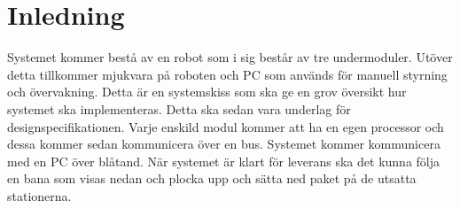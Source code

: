 \section{Inledning}
Systemet kommer bestå av en robot som i sig består av tre undermoduler. Utöver detta tillkommer mjukvara på roboten och PC som används för manuell styrning och övervakning. Detta är en systemskiss som ska ge en grov översikt hur systemet ska implementeras. Detta ska sedan vara underlag för designspecifikationen. 
\newline
\newline
Varje enskild modul kommer att ha en egen processor och dessa kommer sedan kommunicera över en bus. Systemet kommer kommunicera med en PC över blåtand. När systemet är klart för leverans ska det kunna följa en bana som visas nedan och plocka upp och sätta ned paket på de utsatta stationerna. 